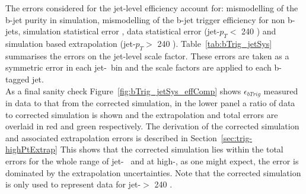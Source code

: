 The errors considered for the jet-level efficiency account for:
mismodelling of the b-jet purity in simulation, mismodelling of the b-jet trigger efficiency for non b-jets,
simulation statistical error , data statistical error (jet-$p_T <$ 240 \GeV) and simulation based extrapolation (jet-$p_T >$ 240 \GeV).
Table~\ref{tab:bTrig_jetSys} summarises the errors on the jet-level scale factor.
These errors are taken as a symmetric error in each jet-\pT~bin and the scale factors are applied to each b-tagged jet.\\

As a final sanity check Figure~\ref{fig:bTrig_jetSys_effComp} shows $\epsilon_{bTrig}$ measured in data to
that from the corrected simulation, in the lower panel a ratio of data to corrected simulation is shown
and the extrapolation and total errors are overlaid in red and green respectively.
The derivation of the corrected simulation and associated extrapolation errors is described in Section~\ref{sec:trig-highPtExtrap}
This shows that the corrected simulation lies within the total errors for the whole range of jet-\pT~
and at high-\pT, as one might expect, the error is dominated by the extrapolation uncertainties.
Note that the corrected simulation is only used to represent data for jet-\pT $>$ 240 \GeV.

